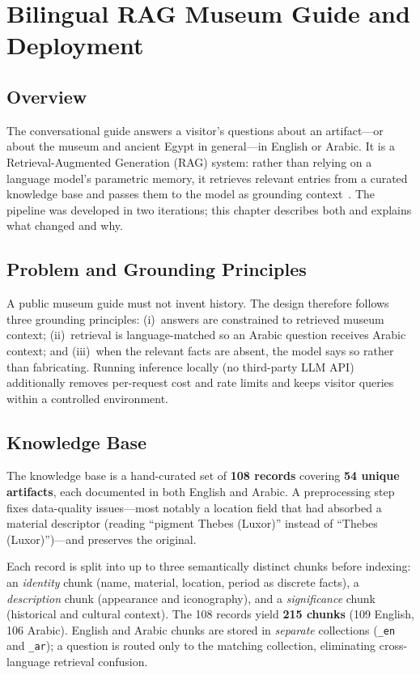 \chapter{Bilingual RAG Museum Guide and Deployment}

\section{Overview}

The conversational guide answers a visitor's questions about an artifact---or about
the museum and ancient Egypt in general---in English or Arabic. It is a
Retrieval-Augmented Generation (RAG) system: rather than relying on a language model's
parametric memory, it retrieves relevant entries from a curated knowledge base and
passes them to the model as grounding context~\citep{lewis2020rag}. The pipeline was
developed in two iterations; this chapter describes both and explains what changed and
why.

\section{Problem and Grounding Principles}

A public museum guide must not invent history. The design therefore follows three
grounding principles: (i)~answers are constrained to retrieved museum context;
(ii)~retrieval is language-matched so an Arabic question receives Arabic context; and
(iii)~when the relevant facts are absent, the model says so rather than fabricating.
Running inference locally (no third-party LLM API) additionally removes per-request
cost and rate limits and keeps visitor queries within a controlled environment.

\section{Knowledge Base}

The knowledge base is a hand-curated set of \textbf{108 records} covering \textbf{54
unique artifacts}, each documented in both English and Arabic. A preprocessing step
fixes data-quality issues---most notably a location field that had absorbed a material
descriptor (reading ``pigment Thebes (Luxor)'' instead of ``Thebes (Luxor)'')---and
preserves the original.

Each record is split into up to three semantically distinct chunks before indexing:
an \emph{identity} chunk (name, material, location, period as discrete facts), a
\emph{description} chunk (appearance and iconography), and a \emph{significance} chunk
(historical and cultural context). The 108 records yield \textbf{215 chunks} (109
English, 106 Arabic). English and Arabic chunks are stored in \emph{separate}
collections (\texttt{\_en} and \texttt{\_ar}); a question is routed only to the
matching collection, eliminating cross-language retrieval confusion.

